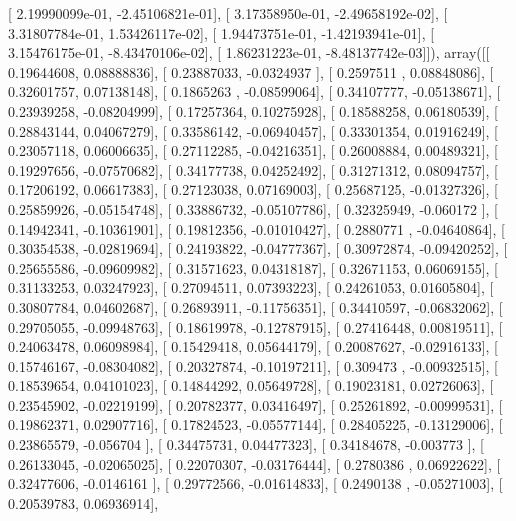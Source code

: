 \documentclass{article}
\begin{document}
       [  2.19990099e-01,  -2.45106821e-01],
       [  3.17358950e-01,  -2.49658192e-02],
       [  3.31807784e-01,   1.53426117e-02],
       [  1.94473751e-01,  -1.42193941e-01],
       [  3.15476175e-01,  -8.43470106e-02],
       [  1.86231223e-01,  -8.48137742e-03]]), array([[ 0.19644608,  0.08888836],
       [ 0.23887033, -0.0324937 ],
       [ 0.2597511 ,  0.08848086],
       [ 0.32601757,  0.07138148],
       [ 0.1865263 , -0.08599064],
       [ 0.34107777, -0.05138671],
       [ 0.23939258, -0.08204999],
       [ 0.17257364,  0.10275928],
       [ 0.18588258,  0.06180539],
       [ 0.28843144,  0.04067279],
       [ 0.33586142, -0.06940457],
       [ 0.33301354,  0.01916249],
       [ 0.23057118,  0.06006635],
       [ 0.27112285, -0.04216351],
       [ 0.26008884,  0.00489321],
       [ 0.19297656, -0.07570682],
       [ 0.34177738,  0.04252492],
       [ 0.31271312,  0.08094757],
       [ 0.17206192,  0.06617383],
       [ 0.27123038,  0.07169003],
       [ 0.25687125, -0.01327326],
       [ 0.25859926, -0.05154748],
       [ 0.33886732, -0.05107786],
       [ 0.32325949, -0.060172  ],
       [ 0.14942341, -0.10361901],
       [ 0.19812356, -0.01010427],
       [ 0.2880771 , -0.04640864],
       [ 0.30354538, -0.02819694],
       [ 0.24193822, -0.04777367],
       [ 0.30972874, -0.09420252],
       [ 0.25655586, -0.09609982],
       [ 0.31571623,  0.04318187],
       [ 0.32671153,  0.06069155],
       [ 0.31133253,  0.03247923],
       [ 0.27094511,  0.07393223],
       [ 0.24261053,  0.01605804],
       [ 0.30807784,  0.04602687],
       [ 0.26893911, -0.11756351],
       [ 0.34410597, -0.06832062],
       [ 0.29705055, -0.09948763],
       [ 0.18619978, -0.12787915],
       [ 0.27416448,  0.00819511],
       [ 0.24063478,  0.06098984],
       [ 0.15429418,  0.05644179],
       [ 0.20087627, -0.02916133],
       [ 0.15746167, -0.08304082],
       [ 0.20327874, -0.10197211],
       [ 0.309473  , -0.00932515],
       [ 0.18539654,  0.04101023],
       [ 0.14844292,  0.05649728],
       [ 0.19023181,  0.02726063],
       [ 0.23545902, -0.02219199],
       [ 0.20782377,  0.03416497],
       [ 0.25261892, -0.00999531],
       [ 0.19862371,  0.02907716],
       [ 0.17824523, -0.05577144],
       [ 0.28405225, -0.13129006],
       [ 0.23865579, -0.056704  ],
       [ 0.34475731,  0.04477323],
       [ 0.34184678, -0.003773  ],
       [ 0.26133045, -0.02065025],
       [ 0.22070307, -0.03176444],
       [ 0.2780386 ,  0.06922622],
       [ 0.32477606, -0.0146161 ],
       [ 0.29772566, -0.01614833],
       [ 0.2490138 , -0.05271003],
       [ 0.20539783,  0.06936914],
\end{document}
